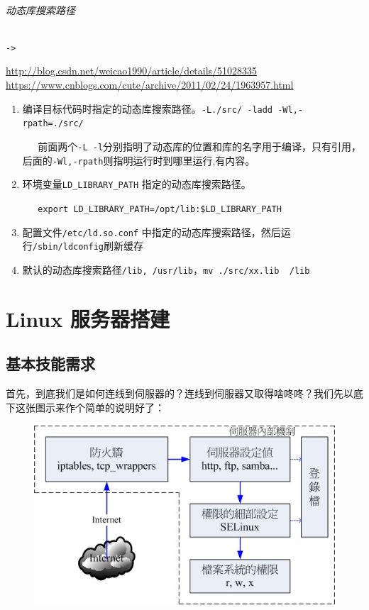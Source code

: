 \documentclass[UTF8,a4paper,12pt]{ctexbook}
\begin{document}
			
			\subparagraph{动态库搜索路径}\verb|->|
			
				\url{http://blog.csdn.net/weicao1990/article/details/51028335}			
				\url{https://www.cnblogs.com/cute/archive/2011/02/24/1963957.html}
				
				\begin{enumerate}[itemindent= 2em]
					\item 编译目标代码时指定的动态库搜索路径。\verb|-L./src/ -ladd -Wl,-rpath=./src/|
					
					\verb|   |前面两个\verb|-L -l|分别指明了动态库的位置和库的名字用于编译，只有引用， 后面的\verb|-Wl,-rpath|则指明运行时到哪里运行,有内容。
					
					\item 环境变量\verb|LD_LIBRARY_PATH| 指定的动态库搜索路径。
					
					\verb|   export LD_LIBRARY_PATH=/opt/lib:$LD_LIBRARY_PATH|
					\item 配置文件\verb|/etc/ld.so.conf| 中指定的动态库搜索路径，然后运行\verb|/sbin/ldconfig|刷新缓存
					\item 默认的动态库搜索路径\verb|/lib, /usr/lib|，\verb|mv ./src/xx.lib  /lib|
				\end{enumerate}
		
\chapter{Linux 服务器搭建}
	\section{基本技能需求}
		首先，到底我们是如何连线到伺服器的？连线到伺服器又取得啥咚咚？我们先以底下这张图示来作个简单的说明好了：
		
		\begin{figure}[h]
			\centering
			\includegraphics[scale = 0.8]{figure/linuxServerExample.jpg}
		\end{figure}
		
\end{document}
